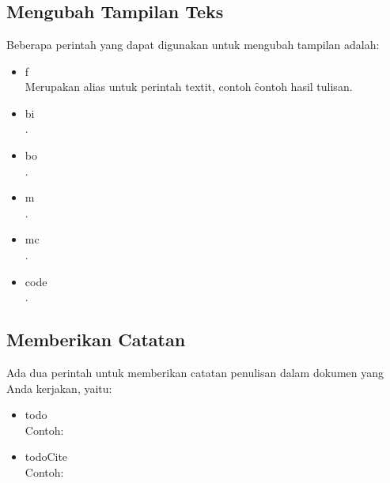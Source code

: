 \chapter{\babLima}


\section{Mengubah Tampilan Teks}
Beberapa perintah yang dapat digunakan untuk mengubah tampilan adalah: 
\begin{itemize}
	\item \bslash f \\
		Merupakan alias untuk perintah \bslash textit, contoh 
		\f{contoh hasil tulisan}.
	\item \bslash bi \\
		.
	\item \bslash bo \\
		.
	\item \bslash m \\
		.
	\item \bslash mc \\
		.
	\item \bslash code \\ 
		.
\end{itemize}


\section{Memberikan Catatan}
Ada dua perintah untuk memberikan catatan penulisan dalam dokumen yang Anda 
kerjakan, yaitu: 
\begin{itemize}
	\item \bslash todo \\
		Contoh: \\ 
	\item \bslash todoCite \\ 
		Contoh: \todoCite
\end{itemize}


